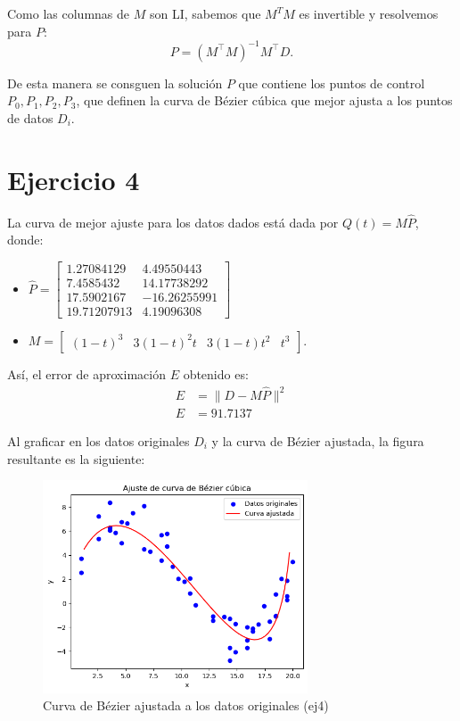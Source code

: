 \documentclass{article}
\begin{document}
Como las columnas de $M$ son LI, sabemos que $M^TM$ es invertible y resolvemos para \( P \):
\[
P = (M^\top M)^{-1} M^\top D.
\]

De esta manera se consguen la solución \( P \) que contiene los puntos de control \( P_0, P_1, P_2, P_3 \), que definen la curva de Bézier cúbica que mejor ajusta a los puntos de datos \( D_i \).

\section*{Ejercicio 4}
La curva de mejor ajuste para los datos dados está dada por $Q(t) = M \hat P$, donde:

\begin{itemize}
    \item $\hat P = 
\begin{bmatrix}
1.27084129 & 4.49550443\\
7.4585432 & 14.17738292\\
17.5902167 & -16.26255991\\
19.71207913 &  4.19096308
\end{bmatrix}$ 

    \item $M =
\begin{bmatrix}
(1 - t)^3 & 3(1 - t)^2 t & 3(1 - t) t^2 & t^3
\end{bmatrix}$.
\end{itemize}

Así, el error de aproximación $E$ obtenido es: 
$$
\begin{aligned}
E &= \|D - M \hat P \|^2 \\
E &= 91.7137
\end{aligned}
$$

Al graficar en los datos originales $D_i$ y la curva de Bézier ajustada, la figura resultante es la siguiente:

\begin{figure}[H]
    \centering
    \includegraphics[width=0.7\textwidth]{Imagenes/ej4.png}
    \caption{Curva de Bézier ajustada a los datos originales (ej4)}
\end{figure}
\end{document}
